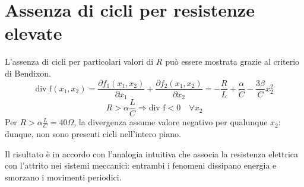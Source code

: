 \section{Assenza di cicli per resistenze elevate}
L'assenza di cicli per particolari valori di $R$ può essere mostrata grazie al criterio di Bendixon.
\begin{equation}
    \textrm{div f}(x_1, x_2) = \frac{\partial f_1(x_1,x_2)}{\partial x_1} + \frac{\partial f_2(x_1,x_2)}{\partial x_2} = -\frac{R}{L} + \frac{\alpha}{C} - \frac{3\beta}{C}x_2^2
\end{equation}
\begin{equation}\label{big-resistance}
    R > \alpha \frac{L}{C} \Longrightarrow \textrm{div f}<0 \quad \forall x_2
\end{equation}
Per $R > \alpha \frac{L}{C} = 40 \Omega$, la divergenza assume valore negativo per qualunque $x_2$: dunque, non sono presenti cicli nell'intero piano.

Il risultato è in accordo con l'analogia intuitiva che associa la resistenza elettrica con l'attrito nei sistemi meccanici: entrambi i fenomeni dissipano energia e smorzano i movimenti periodici.

